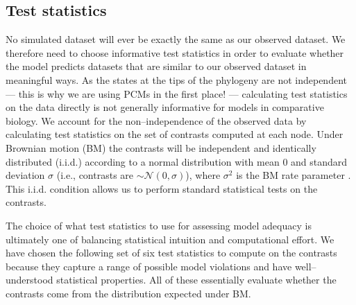 \documentclass[a4paper,11pt]{article}
\begin{document}
\subsection{Test statistics}
No simulated dataset will ever be exactly the same as our observed dataset. We therefore need to choose informative test statistics in order to evaluate whether the model predicts datasets that are similar to our observed dataset in meaningful ways. As the states at the tips of the phylogeny are not independent --- this is why we are using PCMs in the first place! --- calculating test statistics on the data directly is not generally informative for models in comparative biology. We account for the non--independence of the observed data by calculating test statistics on the set of contrasts \citep[i.e., ``phylogenetically independent contrasts'', \emph{sensu}][]{Felsenstein1985} computed at each node. \citep[We refer readers to][for details on how contrasts are calculated.]{Felsenstein1985, Rohlf2001, Blomberg2012} Under Brownian motion (BM) the contrasts will be independent and identically distributed (i.i.d.) according to a normal distribution with mean 0 and standard deviation $\sigma$ (i.e., contrasts are $\sim \mathcal{N}(0, \sigma)$), where $\sigma^2$ is the BM rate parameter \citep{Felsenstein1985}. This i.i.d. condition allows us to perform standard statistical tests on the contrasts. 

The choice of what test statistics to use for assessing model adequacy is ultimately one of balancing statistical intuition and computational effort. We have chosen the following set of six test statistics to compute on the contrasts because they capture a range of possible model violations and have well--understood statistical properties. All of these essentially evaluate whether the contrasts come from the distribution expected under BM. 
\end{document}
